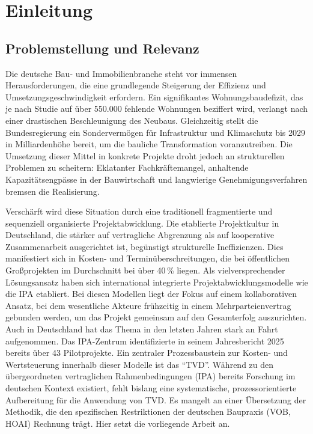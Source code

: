 \chapter{Einleitung}
\label{ch:1}

\section{Problemstellung und Relevanz}
\label{sec:1.1}

Die deutsche Bau- und Immobilienbranche steht vor immensen Herausforderungen, die eine grundlegende Steigerung der Effizienz und Umsetzungsgeschwindigkeit erfordern. Ein signifikantes Wohnungsbaudefizit, das je nach Studie auf über 550.000 fehlende Wohnungen beziffert wird, verlangt nach einer drastischen Beschleunigung des Neubaus. \autocite[Vgl.][S.~8]{walberg_wohnungsbau_2025} Gleichzeitig stellt die Bundesregierung ein Sondervermögen für Infrastruktur und Klimaschutz bis 2029 in Milliardenhöhe bereit, um die bauliche Transformation voranzutreiben. \autocite[Vgl.][online]{brinkmeier_bundeshaushalt_2025} Die Umsetzung dieser Mittel in konkrete Projekte droht jedoch an strukturellen Problemen zu scheitern: Eklatanter Fachkräftemangel, anhaltende Kapazitätsengpässe in der Bauwirtschaft und langwierige Genehmigungsverfahren bremsen die Realisierung.

Verschärft wird diese Situation durch eine traditionell fragmentierte und sequenziell organisierte Projektabwicklung. Die etablierte Projektkultur in Deutschland, die stärker auf vertragliche Abgrenzung als auf kooperative Zusammenarbeit ausgerichtet ist, begünstigt strukturelle Ineffizienzen. Dies manifestiert sich in Kosten- und Terminüberschreitungen, die bei öffentlichen Großprojekten im Durchschnitt bei über 40\,\% liegen.\autocite[Vgl.][S.~1]{kostka_grosprojekte_2025}
Als vielversprechender Lösungsansatz haben sich international integrierte Projektabwicklungsmodelle wie die \ac{IPA} etabliert. Bei diesen Modellen liegt der Fokus auf einem kollaborativen Ansatz, bei dem wesentliche Akteure frühzeitig in einem Mehrparteienvertrag gebunden werden, um das Projekt gemeinsam auf den Gesamterfolg auszurichten.
Auch in Deutschland hat das Thema in den letzten Jahren stark an Fahrt aufgenommen. Das \acs{IPA}-Zentrum identifizierte in seinem Jahresbericht 2025 bereits über 43 Pilotprojekte\autocite[Vgl.][S.~11]{haghsheno_ipa-report_2025}.
Ein zentraler Prozessbaustein zur Kosten- und Wertsteuerung innerhalb dieser Modelle ist das \enquote{\ac{TVD}}. Während zu den übergeordneten vertraglichen Rahmenbedingungen (\ac{IPA}) bereits Forschung im deutschen Kontext existiert, fehlt bislang eine systematische, prozessorientierte Aufbereitung für die Anwendung von \ac{TVD}. Es mangelt an einer Übersetzung der Methodik, die den spezifischen Restriktionen der deutschen Baupraxis (\acs{VOB}, \acs{HOAI}) Rechnung trägt. Hier setzt die vorliegende Arbeit an.

